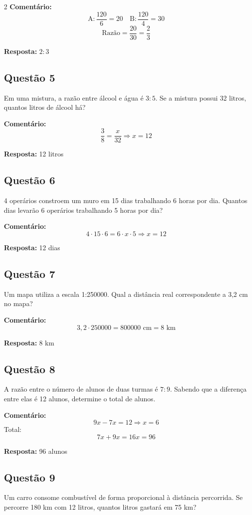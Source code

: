\documentclass[11pt]{article}
\begin{document}
\begin{multicols}{2}
\textbf{Comentário:}
\[
\text{A}: \frac{120}{6} = 20
\quad
\text{B}: \frac{120}{4} = 30
\]
\[
\text{Razão} = \frac{20}{30} = \frac{2}{3}
\]

\textbf{Resposta:} $2:3$

\subsection*{Questão 5}
Em uma mistura, a razão entre álcool e água é $3:5$. Se a mistura possui 32 litros, quantos litros de álcool há?

\textbf{Comentário:}
\[
\frac{3}{8} = \frac{x}{32}
\Rightarrow x = 12
\]

\textbf{Resposta:} 12 litros

\subsection*{Questão 6}
4 operários constroem um muro em 15 dias trabalhando 6 horas por dia. Quantos dias levarão 6 operários trabalhando 5 horas por dia?

\textbf{Comentário:}
\[
4 \cdot 15 \cdot 6 = 6 \cdot x \cdot 5
\Rightarrow x = 12
\]

\textbf{Resposta:} 12 dias

\subsection*{Questão 7}
Um mapa utiliza a escala 1:250000. Qual a distância real correspondente a 3,2 cm no mapa?

\textbf{Comentário:}
\[
3{,}2 \cdot 250000 = 800000 \text{ cm} = 8 \text{ km}
\]

\textbf{Resposta:} 8 km

\subsection*{Questão 8}
A razão entre o número de alunos de duas turmas é $7:9$. Sabendo que a diferença entre elas é 12 alunos, determine o total de alunos.

\textbf{Comentário:}
\[
9x - 7x = 12 \Rightarrow x = 6
\]
Total:
\[
7x + 9x = 16x = 96
\]

\textbf{Resposta:} 96 alunos

\subsection*{Questão 9}
Um carro consome combustível de forma proporcional à distância percorrida. Se percorre 180 km com 12 litros, quantos litros gastará em 75 km?


\end{multicols}
\end{document}
